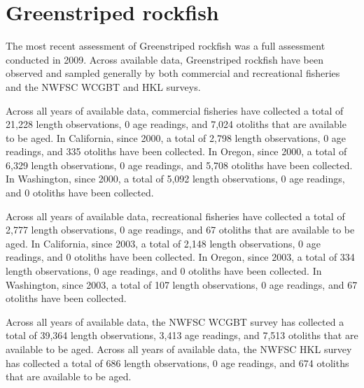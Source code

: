 \documentclass[11pt,
  english,
  letterpaper,
]{article}
\begin{document}

\hypertarget{greenstriped-rockfish}{%
\section{Greenstriped rockfish}\label{greenstriped-rockfish}}

\leavevmode\tagmcend\tagstructend


The most recent assessment of Greenstriped rockfish was a full assessment conducted in 2009. Across available data, Greenstriped rockfish have been observed and sampled generally by both commercial and recreational fisheries and the NWFSC WCGBT and HKL surveys.

\leavevmode\tagmcend\tagstructend\par


Across all years of available data, commercial fisheries have collected a total of 21,228 length observations, 0 age readings, and 7,024 otoliths that are available to be aged. In California, since 2000, a total of 2,798 length observations, 0 age readings, and 335 otoliths have been collected. In Oregon, since 2000, a total of 6,329 length observations, 0 age readings, and 5,708 otoliths have been collected. In Washington, since 2000, a total of 5,092 length observations, 0 age readings, and 0 otoliths have been collected.

\leavevmode\tagmcend\tagstructend\par


Across all years of available data, recreational fisheries have collected a total of 2,777 length observations, 0 age readings, and 67 otoliths that are available to be aged. In California, since 2003, a total of 2,148 length observations, 0 age readings, and 0 otoliths have been collected. In Oregon, since 2003, a total of 334 length observations, 0 age readings, and 0 otoliths have been collected. In Washington, since 2003, a total of 107 length observations, 0 age readings, and 67 otoliths have been collected.

\leavevmode\tagmcend\tagstructend\par


Across all years of available data, the NWFSC WCGBT survey has collected a total of 39,364 length observations, 3,413 age readings, and 7,513 otoliths that are available to be aged. Across all years of available data, the NWFSC HKL survey has collected a total of 686 length observations, 0 age readings, and 674 otoliths that are available to be aged.
\end{document}
